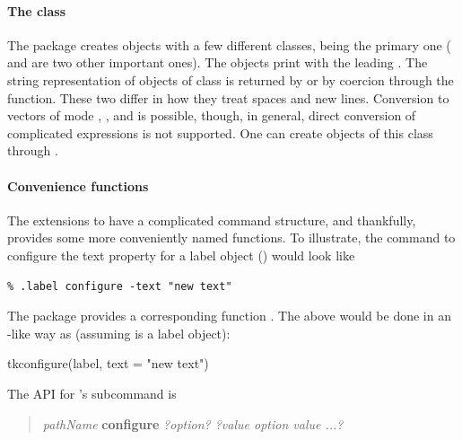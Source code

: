 \paragraph{The  class}
The  package creates objects with a few different classes,
 being the primary one ( and 
are two other important ones).  The  objects print with
the leading . The string representation of objects of
class  is returned by  or by coercion
through the  function. These two differ in how
they treat spaces and new lines.  Conversion to vectors of mode
, ,  and 
is possible, though, in general, direct conversion of complicated
\TCL\/ expressions is not supported. One can create objects of this
class through .



\paragraph{Convenience functions}
The \TK\/ extensions to \TCL\/ have a complicated command structure,
and thankfully,  provides some more conveniently named
functions. To illustrate, the \TCL\/ command to configure the text property for
a label object () would look like
\begin{verbatim}
% .label configure -text "new text"
\end{verbatim}
The  package provides a corresponding function
. The above would be done in an \R-like way as (assuming  is a
label object):


\begin{Schunk}
\begin{Sinput}
 tkconfigure(label, text = "new text")
\end{Sinput}
\end{Schunk}




The \TK\/ API for 's  subcommand is

\begin{quotation}
  \textit{pathName} \textbf{configure} \textit{?option? ?value option value ...?}
\end{quotation}


